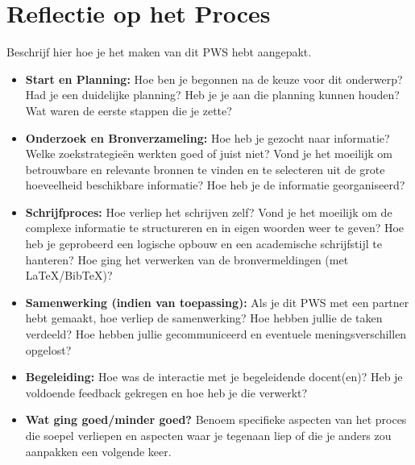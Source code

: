 \documentclass[11pt, a4paper]{report} %
\begin{document}
\section{Reflectie op het Proces}
Beschrijf hier hoe je het maken van dit PWS hebt aangepakt.
\begin{itemize}
    \item \textbf{Start en Planning:} Hoe ben je begonnen na de keuze voor dit onderwerp? Had je een duidelijke planning? Heb je je aan die planning kunnen houden? Wat waren de eerste stappen die je zette?
    \item \textbf{Onderzoek en Bronverzameling:} Hoe heb je gezocht naar informatie? Welke zoekstrategieën werkten goed of juist niet? Vond je het moeilijk om betrouwbare en relevante bronnen te vinden en te selecteren uit de grote hoeveelheid beschikbare informatie? Hoe heb je de informatie georganiseerd?
    \item \textbf{Schrijfproces:} Hoe verliep het schrijven zelf? Vond je het moeilijk om de complexe informatie te structureren en in eigen woorden weer te geven? Hoe heb je geprobeerd een logische opbouw en een academische schrijfstijl te hanteren? Hoe ging het verwerken van de bronvermeldingen (met LaTeX/BibTeX)?
    \item \textbf{Samenwerking (indien van toepassing):} Als je dit PWS met een partner hebt gemaakt, hoe verliep de samenwerking? Hoe hebben jullie de taken verdeeld? Hoe hebben jullie gecommuniceerd en eventuele meningsverschillen opgelost?
    \item \textbf{Begeleiding:} Hoe was de interactie met je begeleidende docent(en)? Heb je voldoende feedback gekregen en hoe heb je die verwerkt?
    \item \textbf{Wat ging goed/minder goed?} Benoem specifieke aspecten van het proces die soepel verliepen en aspecten waar je tegenaan liep of die je anders zou aanpakken een volgende keer.
\end{itemize}
\lipsum[3] %
\end{document}
